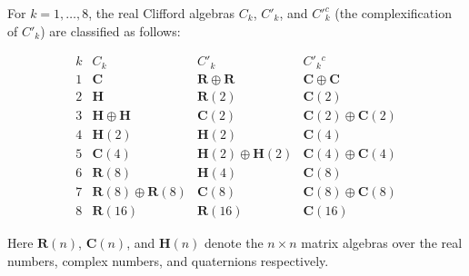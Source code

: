 For $k = 1, \ldots, 8$, the real Clifford algebras $C_k$, $C'_k$, and $C'_k^c$ (the complexification of $C'_k$) are classified as follows:

\[
\begin{array}{c|c|c|c}
k & C_k & C'_k & C'_k{}^c \\
\hline
1 & \mathbf{C} & \mathbf{R} \oplus \mathbf{R} & \mathbf{C} \oplus \mathbf{C} \\
2 & \mathbf{H} & \mathbf{R}(2) & \mathbf{C}(2) \\
3 & \mathbf{H} \oplus \mathbf{H} & \mathbf{C}(2) & \mathbf{C}(2) \oplus \mathbf{C}(2) \\
4 & \mathbf{H}(2) & \mathbf{H}(2) & \mathbf{C}(4) \\
5 & \mathbf{C}(4) & \mathbf{H}(2) \oplus \mathbf{H}(2) & \mathbf{C}(4) \oplus \mathbf{C}(4) \\
6 & \mathbf{R}(8) & \mathbf{H}(4) & \mathbf{C}(8) \\
7 & \mathbf{R}(8) \oplus \mathbf{R}(8) & \mathbf{C}(8) & \mathbf{C}(8) \oplus \mathbf{C}(8) \\
8 & \mathbf{R}(16) & \mathbf{R}(16) & \mathbf{C}(16)
\end{array}
\]

Here $\mathbf{R}(n)$, $\mathbf{C}(n)$, and $\mathbf{H}(n)$ denote the $n \times n$ matrix algebras over the real numbers, complex numbers, and quaternions respectively.
